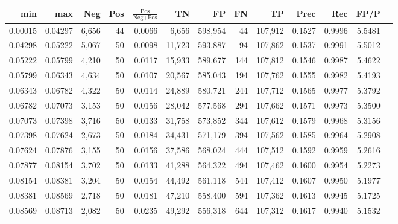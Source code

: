 \begin{tabular}{rrrrrrrrrrrrr}
\toprule
    min &     max &   Neg & Pos & $\frac{\text{Pos}}{\text{Neg}+\text{Pos}}$ &      TN &      FP &      FN &      TP &   Prec &    Rec &   FP/P \\
\midrule
0.00015 & 0.04297 & 6,656 &  44 &                                     0.0066 &   6,656 & 598,954 &      44 & 107,912 & 0.1527 & 0.9996 & 5.5481 \\
0.04298 & 0.05222 & 5,067 &  50 &                                     0.0098 &  11,723 & 593,887 &      94 & 107,862 & 0.1537 & 0.9991 & 5.5012 \\
0.05222 & 0.05799 & 4,210 &  50 &                                     0.0117 &  15,933 & 589,677 &     144 & 107,812 & 0.1546 & 0.9987 & 5.4622 \\
0.05799 & 0.06343 & 4,634 &  50 &                                     0.0107 &  20,567 & 585,043 &     194 & 107,762 & 0.1555 & 0.9982 & 5.4193 \\
0.06343 & 0.06782 & 4,322 &  50 &                                     0.0114 &  24,889 & 580,721 &     244 & 107,712 & 0.1565 & 0.9977 & 5.3792 \\
0.06782 & 0.07073 & 3,153 &  50 &                                     0.0156 &  28,042 & 577,568 &     294 & 107,662 & 0.1571 & 0.9973 & 5.3500 \\
0.07073 & 0.07398 & 3,716 &  50 &                                     0.0133 &  31,758 & 573,852 &     344 & 107,612 & 0.1579 & 0.9968 & 5.3156 \\
0.07398 & 0.07624 & 2,673 &  50 &                                     0.0184 &  34,431 & 571,179 &     394 & 107,562 & 0.1585 & 0.9964 & 5.2908 \\
0.07624 & 0.07876 & 3,155 &  50 &                                     0.0156 &  37,586 & 568,024 &     444 & 107,512 & 0.1592 & 0.9959 & 5.2616 \\
0.07877 & 0.08154 & 3,702 &  50 &                                     0.0133 &  41,288 & 564,322 &     494 & 107,462 & 0.1600 & 0.9954 & 5.2273 \\
0.08154 & 0.08381 & 3,204 &  50 &                                     0.0154 &  44,492 & 561,118 &     544 & 107,412 & 0.1607 & 0.9950 & 5.1977 \\
0.08381 & 0.08569 & 2,718 &  50 &                                     0.0181 &  47,210 & 558,400 &     594 & 107,362 & 0.1613 & 0.9945 & 5.1725 \\
0.08569 & 0.08713 & 2,082 &  50 &                                     0.0235 &  49,292 & 556,318 &     644 & 107,312 & 0.1617 & 0.9940 & 5.1532 \\

\end{tabular}

